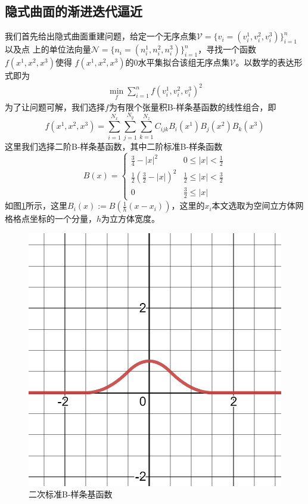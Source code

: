\subsection{隐式曲面的渐进迭代逼近}
我们首先给出隐式曲面重建问题，给定一个无序点集$\mathcal{V} = \{v_i = (v_i^1,v_i^2,v_i^3)\}_{i = 1}^n$以及点
上的单位法向量$\mathcal{N} = \{n_i = (n_i^1, n_i^2, n_i^3)\}_{i = 1}^n$，寻找一个函数$f(x^1,x^2,x^3)$使得
$f(x^1,x^2,x^3)$的$0$水平集拟合该组无序点集$\mathcal{V}$。以数学的表达形式即为
\begin{equation}
    \begin{split}
        \min_f\sum_{i = 1}^{n} f(v_i^1,v_i^2,v_i^3)^2       
    \end{split}
\end{equation}
为了让问题可解，我们选择$f$为有限个张量积B-样条基函数的线性组合，即$$f(x^1,x^2,x^3) = \sum_{i = 1}^{N_x}\sum_{j = 1}^{N_y}\sum_{k = 1}^{N_z} C_{ijk}B_i(x^1)B_j(x^2)B_k(x^3)$$
这里我们选择二阶B-样条基函数，其中二阶标准B-样条函数
$$B(x) = \begin{cases}
    \frac{3}{4} - \left | x \right | ^2  & 0 \leq \left | x \right | < \frac{1}{2}\\
    \frac{1}{2}(\frac{3}{2} - \left | x \right |)^2 & \frac{1}{2}\leq \left | x \right | <\frac{3}{2}\\
    0 & \frac{3}{2} \leq \left | x \right |
   \end{cases}$$
如图\ref{fig: standard B-spline basis}所示，这里$B_i(x) := B(\frac{1}{h}(x - x_i))$，这里的$x_i$本文选取为空间立方体网格格点坐标的一个分量，$h$为立方体宽度。
\begin{figure}[htbp]
    \centering
    \includegraphics[scale=0.2]{./images/image8.png}
    \caption{二次标准B-样条基函数}
    \label{fig: standard B-spline basis}
\end{figure}
